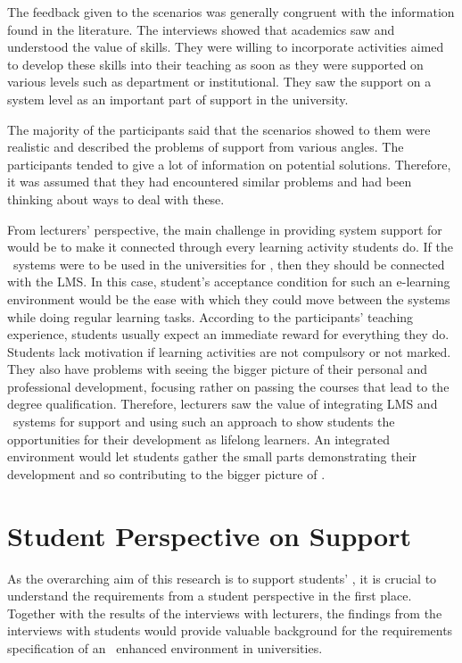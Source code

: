 The feedback given to the scenarios was generally congruent with the information
found in the literature. The interviews showed that academics saw and understood
the value of \LLLs skills. They were willing to incorporate activities aimed to
develop these skills into their teaching as soon as they were supported on
various levels such as department or institutional. They saw the support on a
system level as an important part of \LLLs support in the university.

The majority of the participants said that the scenarios showed to them were
realistic and described the problems of \LLLs support from various angles. The
participants tended to give a lot of information on potential solutions.
Therefore, it was assumed that they had encountered similar problems and had
been thinking about ways to deal with these.

From lecturers' perspective, the main challenge in providing system support for
\LLLs would be to make it connected through every learning activity students do.
If the \ep~systems were to be used in the universities for \LLLs, then they
should be connected with the LMS. In this case, student's acceptance condition
for such an e-learning environment would be the ease with which they could move
between the systems while doing regular learning tasks. According to the
participants' teaching experience, students usually expect an immediate reward
for everything they do. Students lack motivation if learning activities are not
compulsory or not marked. They also have problems with seeing the bigger picture
of their personal and professional development, focusing rather on passing the
courses that lead to the degree qualification. Therefore, lecturers saw the
value of integrating LMS and \ep~systems for \LLLs support and using such
an approach to show students the opportunities for their development as lifelong
learners. An integrated environment would let students gather the small parts
demonstrating their development and so contributing to the bigger picture of
\LLLsn.

\section{Student Perspective on \LLLc Support}

As the overarching aim of this research is to support students' \LLLsn, it is
crucial to understand the requirements from a student perspective in the first
place. Together with the results of the interviews with lecturers, the findings
from the interviews with students would provide valuable background for the
requirements specification of an \ep~enhanced environment in universities.

